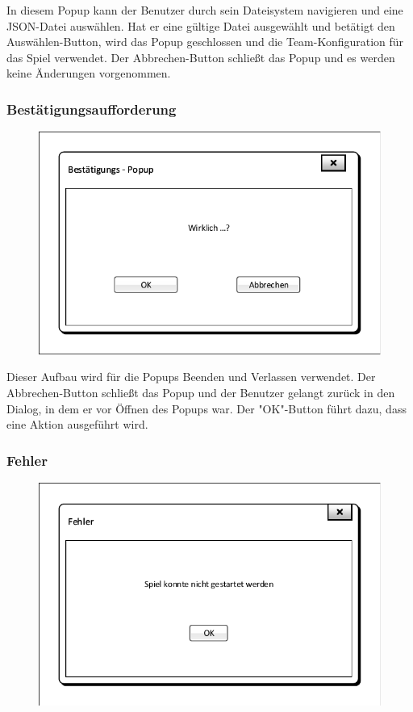 In diesem Popup kann der Benutzer durch sein Dateisystem navigieren und eine JSON-Datei auswählen. Hat er eine gültige Datei ausgewählt und betätigt den \glqq{}Auswählen\grqq{}-Button, wird das Popup geschlossen und die Team-Konfiguration für das Spiel verwendet. Der \glqq{}Abbrechen\grqq{}-Button schließt das Popup und es werden keine Änderungen vorgenommen.

\subsubsection{Bestätigungsaufforderung}
\begin{figure}[H]
	\centering
	\includegraphics[scale=0.8]{images/OK_Popup.pdf}
\end{figure}

Dieser Aufbau wird für die Popups \glqq{}Beenden\grqq{} und \glqq{}Verlassen\grqq{} verwendet. Der \glqq{}Abbrechen\grqq{}-Button schließt das Popup und der Benutzer gelangt zurück in den Dialog, in dem er vor Öffnen des Popups war. Der "OK"-Button führt dazu, dass eine Aktion ausgeführt wird.

\subsubsection{Fehler}
\begin{figure}[H]
	\centering
	\includegraphics[scale=0.8]{images/Fehler_Popup.pdf}
\end{figure}

